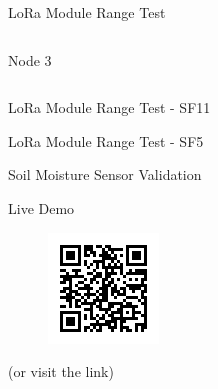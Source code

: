 \documentclass[hyphens]{beamer}
\begin{document}
\begin{frame}{LoRa Module Range Test}
\begin{columns}[T]
\begin{column}{.3\textwidth}
\begin{figure}
    \end{figure}
    \vspace{-1em}
    Node 3
\end{column}
\end{columns}
\end{frame}


\begin{frame}{LoRa Module Range Test - SF11}
\begin{figure}
    
\end{figure}
\begin{figure}
    
\end{figure}
\end{frame}

\begin{frame}{LoRa Module Range Test - SF5}
\begin{figure}
    
\end{figure}
\begin{figure}
    
\end{figure}
\end{frame}


\begin{frame}{Soil Moisture Sensor Validation}
\begin{figure}
    
\end{figure}
\end{frame}


\begin{frame}{Live Demo}
\begin{figure}
    \centering
    \includegraphics[width=.5\linewidth]{img/qr.png}
\end{figure}
\begin{center}
    (or visit the link)
\end{center}
\end{frame}
\end{document}
